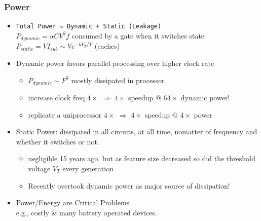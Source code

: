 \documentclass{beamer}
\newcommand{\emp}[1]{\textcolor{DikuRed}{ #1}}
\begin{document}
\begin{frame}[fragile,t]
\frametitle{Power}

\begin{itemize}
    \item \emp{\tt Total Power = Dynamic + Static (Leakage)}\\
                        $P_{dynamic} = \alpha C V^2 f$ 
                        consumed by a gate when it switches state\\
                        $P_{static}  = V I_{sub} \sim V e^{-k V_T / T}$ 
                        (caches)\medskip

    \item Dynamic power 
            favors parallel processing over higher clock rate
            \begin{itemize}
                \item $P_{dynamic} \sim F^3$ mostly dissipated in processor\pause
                \item increase clock freq $4\times$ $\Rightarrow$ \pause
                        $4\times$ speedup @ $64\times$ dynamic power!
                \item replicate a uniprocessor $4\times$ $\Rightarrow$ 
                        $4\times$ speedup @ $4\times$ power
            \end  {itemize}\medskip

    \item Static Power: dissipated in all circuits,  
                at all time, nomatter of frequency and whether
                it switches or not.
            \begin{itemize}
                \item negligible 15 years ago, but as feature size 
                        decreased so did the threshold voltage $V_T$ 
                        every generation
                \item \alert{Recently overtook dynamic power as major 
                        source of dissipation!}
            \end{itemize}\medskip

    \item \emp{Power/Energy are Critical Problems}\\ 
                e.g., costly \& many battery operated devices.
%
\end  {itemize}


\end{frame}
\end{document}

